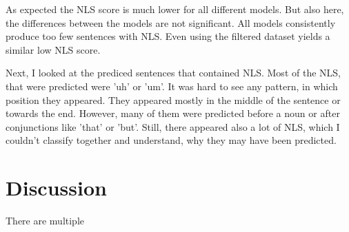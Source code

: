 \documentclass[
	11pt, %
]{fphw}
\begin{document}
As expected the NLS score is much lower for all different models. But also here, the differences between the models are not significant. All models consistently produce too few sentences with NLS. Even using the filtered dataset yields a similar low NLS score.

Next, I looked at the prediced sentences that contained NLS. Most of the NLS, that were predicted were 'uh' or 'um'. It was hard to see any pattern, in which position they appeared. They appeared mostly in the middle of the sentence or towards the end. However, many of them were predicted before a noun or after conjunctions like 'that' or 'but'. Still, there appeared also a lot of NLS, which I couldn't classify together and understand, why they may have been predicted.

\section*{Discussion}
There are multiple
\end{document}
